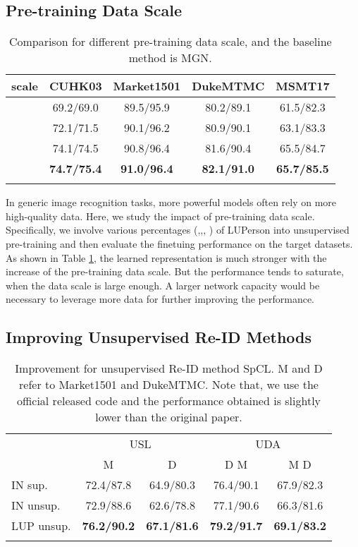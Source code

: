 \documentclass[final]{cvpr}
\begin{document}
\subsection{Pre-training Data Scale}
\begin{table}[h]
\setlength{\tabcolsep}{1.8mm}
\small
    \centering
    \begin{tabular}{l|cccc}
    \shline
    scale & CUHK03 & Market1501 & DukeMTMC & MSMT17 \\
    \hline
     & 69.2/69.0 & 89.5/95.9 & 80.2/89.1 & 61.5/82.3 \\
     & 72.1/71.5 & 90.1/96.2 & 80.9/90.1 & 63.1/83.3 \\
     & 74.1/74.5 & 90.8/96.4 & 81.6/90.4 & 65.5/84.7 \\
     & \textbf{74.7/75.4} & \textbf{91.0/96.4} & \textbf{82.1/91.0} & \textbf{65.7/85.5} \\
    \shline
\end{tabular}
\vspace{-1mm}
\caption{Comparison for different pre-training data scale, and the baseline method is MGN.}
\label{tab:data-scale}
\end{table}
In generic image recognition tasks, more powerful models often rely on more high-quality data. Here, we study the impact of pre-training data scale. Specifically, we involve various percentages (,,, ) of LUPerson into unsupervised pre-training and then evaluate the finetuing performance on the target datasets. As shown in Table \ref{tab:data-scale}, the learned representation is much stronger with the increase of the pre-training data scale. But the performance tends to saturate, when the data scale is large enough. A larger network capacity would be necessary to leverage more data for further improving the performance.

\subsection{Improving Unsupervised Re-ID Methods}
\vspace{-2mm}
\begin{table}[h]
\small
    \centering
    \begin{tabular}{l|cc|cc}
    \shline
    \multirow{2}{*}{pre-train} & \multicolumn{2}{c|}{USL} & \multicolumn{2}{c}{UDA} \\
    \cline{2-5} & M & D & D  M & M  D \\ 
    \hline
    IN sup.    & 72.4/87.8 & 64.9/80.3 & 76.4/90.1 & 67.9/82.3 \\
    IN unsup.  & 72.9/88.6 & 62.6/78.8 & 77.1/90.6 & 66.3/81.6 \\
    LUP unsup. & \textbf{76.2/90.2} & \textbf{67.1/81.6} & \textbf{79.2/91.7} & \textbf{69.1/83.2} \\
    \shline
\end{tabular}
\vspace{-1mm}
\caption{Improvement for unsupervised Re-ID method SpCL. M and D refer to Market1501 and DukeMTMC. Note that, we use the official released code and the performance obtained is slightly lower than the original paper.}
\label{tab:impor-unsup}
\end{table}
\end{document}
